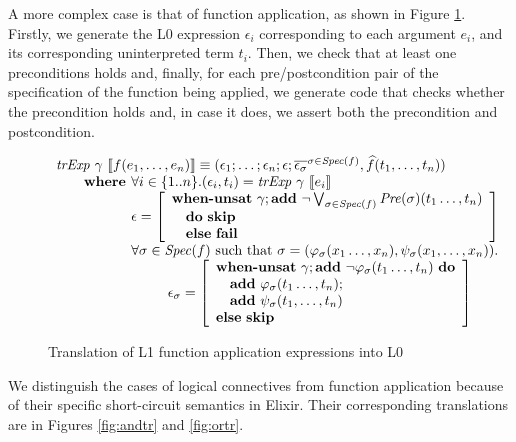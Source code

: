 A more complex case is that of function application, as shown in Figure 
\ref{fig:functr}. Firstly, we generate the L0 expression $\epsilon_i$
corresponding to each argument $e_i$, and its corresponding uninterpreted term
$t_i$. Then, we check that at least one preconditions holds and, finally, for
each pre/postcondition pair of the specification of the function being applied,
we generate code that checks whether the precondition holds and, in case it
does, we assert both the precondition and postcondition.

\begin{figure}
\[
\begin{array}{l}
\trExp{\gamma}{f(e_1, \ldots, e_n)} \equiv (\epsilon_1; \dots; \epsilon_n; \epsilon; \overline{\epsilon_\sigma}^{\sigma \in \Spec{f}}, \widehat{f}(t_1, \ldots, t_n))\\
\qquad \textbf{where } \forall i \in \{1..n\}. (\epsilon_i, t_i) = \trExp{\gamma}{e_i}\\
\qquad \phantom{\textbf{where }} \epsilon = \left[ 
  \begin{array}{l}
  \whenUnsatW~\gamma;\addE~\neg \bigvee_{\sigma \in \Spec{f}}\Pre{\sigma}(t_1\ldots,t_n)\\
  \quad\doW~\skipE\\
  \quad\elseW~\failE\\
  \end{array}
  \right]\\
\qquad \phantom{\textbf{where }} \forall \sigma \in \Spec{f} \textrm{ such that } \sigma = (\varphi_\sigma(x_1\ldots,x_n), \psi_\sigma(x_1, \ldots, x_n)).\\
\qquad\qquad\qquad\qquad \epsilon_\sigma = \left[ 
\begin{array}{l}
\whenUnsatW~\gamma;\addE~\neg \varphi_\sigma(t_1\ldots,t_n)~\doW\\
\quad\addE~\varphi_\sigma(t_1\ldots,t_n);\\
\quad\addE~\psi_\sigma(t_1,\ldots,t_n)\\
\elseW~\skipE\\
\end{array}
\right] \\
\end{array}
\]
\caption{Translation of L1 function application expressions into L0}
\label{fig:functr}
\end{figure}

We distinguish the cases of logical connectives from function application
because of their specific short-circuit semantics in Elixir. Their corresponding 
translations are in Figures \ref{fig:andtr} and \ref{fig:ortr}.

